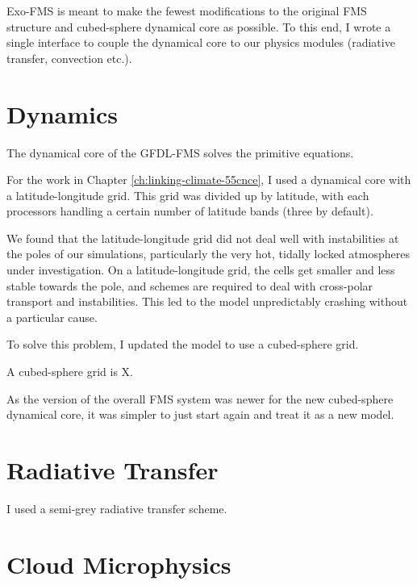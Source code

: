 Exo-FMS is meant to make the fewest modifications to the original FMS structure and cubed-sphere dynamical core as possible. To this end, I wrote a single interface to couple the dynamical core to our physics modules (radiative transfer, convection etc.).



\section{Dynamics}

The dynamical core of the GFDL-FMS solves the primitive equations.


For the work in Chapter \ref{ch:linking-climate-55cnce}, I used a dynamical core with a latitude-longitude grid. This grid was divided up by latitude, with each processors handling a certain number of latitude bands (three by default).

We found that the latitude-longitude grid did not deal well with instabilities at the poles of our simulations, particularly the very hot, tidally locked atmospheres under investigation. On a latitude-longitude grid, the cells get smaller and less stable towards the pole, and schemes are required to deal with cross-polar transport and instabilities. This led to the model unpredictably crashing without a particular cause.


To solve this problem, I updated the model to use a cubed-sphere grid.

A cubed-sphere grid is X.

As the version of the overall FMS system was newer for the new cubed-sphere dynamical core, it was simpler to just start again and treat it as a new model.



\section{Radiative Transfer}


I used a semi-grey radiative transfer scheme.




\section{Cloud Microphysics}

